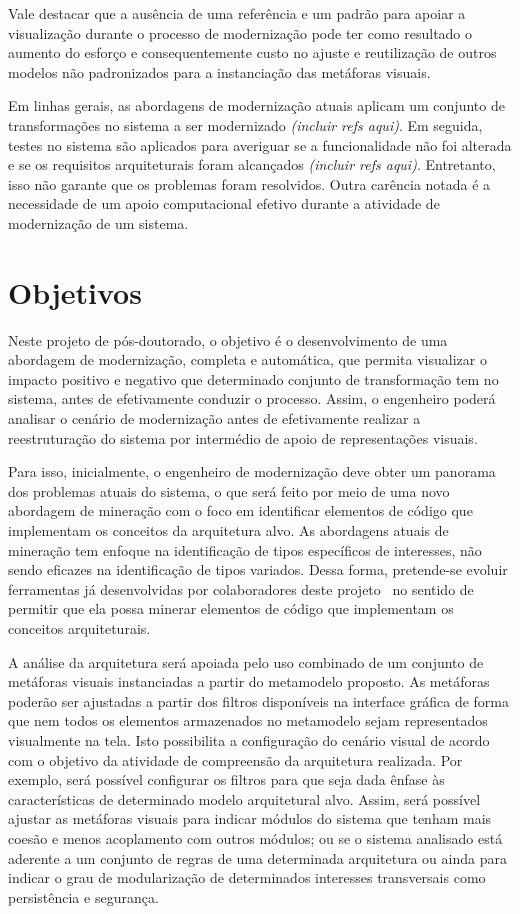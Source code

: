 \documentclass[12pt]{article}
\begin{document}
Vale destacar que a ausência de uma referência e um padrão para apoiar a visualização durante o processo de modernização pode ter como resultado o aumento do esforço e consequentemente custo no ajuste e reutilização de outros modelos não padronizados para a instanciação das metáforas visuais. 

Em linhas gerais, as abordagens de modernização atuais aplicam um conjunto de transformações no sistema a ser modernizado \textit{(incluir refs aqui)}. Em seguida, testes no sistema são aplicados para averiguar se a funcionalidade não foi alterada e se os requisitos arquiteturais foram alcançados \textit{(incluir refs aqui)}. Entretanto, isso não garante que os problemas foram resolvidos. Outra carência notada é a necessidade de um apoio computacional efetivo durante a atividade de modernização de um sistema. 

\section{Objetivos}

Neste projeto de pós-doutorado, o objetivo é o desenvolvimento de uma abordagem de modernização, completa e automática, que permita visualizar o impacto positivo e negativo que determinado conjunto de transformação tem no sistema, antes de efetivamente conduzir o processo. Assim, o engenheiro poderá analisar o cenário de modernização antes de efetivamente realizar a reestruturação do sistema por intermédio de apoio de representações visuais.

Para isso, inicialmente, o engenheiro de modernização deve obter um panorama dos problemas atuais do sistema, o que será feito por meio de uma novo abordagem de mineração com o foco em identificar elementos de código que implementam os conceitos da arquitetura alvo. As abordagens atuais de mineração tem enfoque na identificação de tipos específicos de interesses, não sendo eficazes na identificação de tipos variados. Dessa forma, pretende-se evoluir ferramentas já desenvolvidas por colaboradores deste projeto~\cite{source_miner_glauco, daniel_san_journal} no sentido de permitir que ela possa minerar elementos de código que implementam os conceitos arquiteturais.


A análise da arquitetura será apoiada pelo uso combinado de um conjunto de metáforas visuais instanciadas a partir do metamodelo proposto. As metáforas poderão ser ajustadas a partir dos filtros disponíveis na interface gráfica de forma que nem todos os elementos armazenados no metamodelo sejam representados visualmente na tela. Isto possibilita a configuração do cenário visual de acordo com o objetivo da atividade de compreensão da arquitetura realizada. Por exemplo, será possível configurar os filtros para que seja dada ênfase às características de determinado modelo arquitetural alvo. Assim, será possível ajustar as metáforas visuais para indicar módulos do sistema que tenham mais coesão e menos acoplamento com outros módulos; ou se o sistema analisado está aderente a um conjunto de regras de uma determinada arquitetura ou ainda para indicar o grau de modularização de determinados interesses transversais como persistência e segurança.
\end{document}

